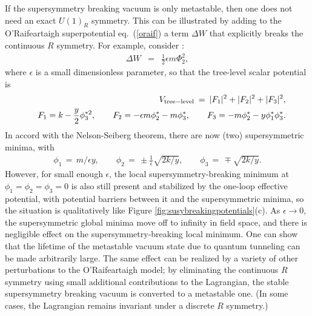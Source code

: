 \documentclass[12pt]{article}
\def\beq{\begin{eqnarray}}
\def\eeq{\end{eqnarray}}
\begin{document}
If the supersymmetry breaking vacuum is only metastable, then one does not need an exact $U(1)_R$ 
symmetry. This can be illustrated by adding to the O'Rai\-f\-ear\-taigh superpotential 
eq.~(\ref{oraif}) a term $\Delta W$ that explicitly breaks the continuous $R$ symmetry. For example, consider 
\cite{Intriligator:2007py}:
\beq
\Delta W &=& \frac{1}{2} \epsilon m \Phi_2^2,
\eeq
where $\epsilon$ is a small dimensionless parameter, so that the tree-level scalar potential is
\beq
&&
V_{\rm tree-level} \>=\> |F_1|^2 + |F_2|^2 + |F_3|^2,
\\
&& F_1 = k - {y\over 2} \phi_3^{*2} ,\qquad
F_2 = -\epsilon m \phi_2^* -m \phi^*_3 ,\qquad
F_3 = -m \phi^*_2 - y \phi^*_1 \phi^*_3 .
\eeq  
In accord with the Nelson-Seiberg theorem,
there are now (two) supersymmetric minima, with
\beq
\phi_1 \,=\, m/\epsilon y,
\qquad
\phi_2 \,=\, \pm \frac{1}{\epsilon} \sqrt{2k/y},
\qquad
\phi_3 \,=\, \mp \sqrt{2k/y}.
\eeq
However, for small enough $\epsilon$, the local supersymmetry-breaking minimum at 
$\phi_1=\phi_2=\phi_3=0$
is also still present and stabilized by 
the one-loop effective potential, with potential barriers 
between it and the supersymmetric minima, so the situation is qualitatively like
Figure \ref{fig:susybreakingpotentials}(c).
As $\epsilon \rightarrow 0$, the supersymmetric global minima 
move off to infinity in field space,
and there is negligible effect on the supersymmetry-breaking local minimum.
One can show \cite{Intriligator:2007py} that the lifetime of the metastable vacuum state 
due to quantum tunneling can be made 
arbitrarily large. The same effect can be realized by a variety of other 
perturbations to the O'Rai\-f\-ear\-taigh model; by eliminating the continuous
$R$ symmetry using small additional contributions to the Lagrangian, 
the stable supersymmetry breaking vacuum is converted to a metastable one. 
(In some cases, the Lagrangian remains invariant under a discrete $R$ symmetry.)
\end{document}
